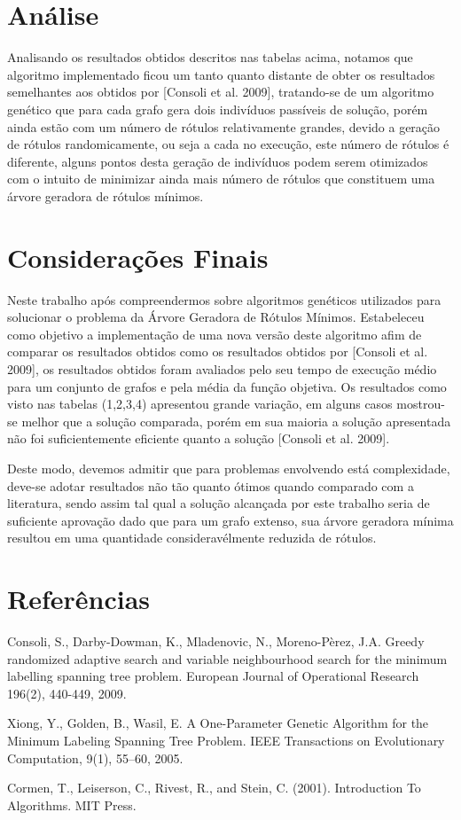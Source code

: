 \documentclass[12pt]{article}
\begin{document}
	\section{Análise}\label{sec:conclusao}

	Analisando os resultados obtidos descritos nas tabelas acima, notamos que algoritmo implementado ficou um tanto quanto distante de obter os resultados semelhantes aos obtidos por [Consoli et al. 2009], tratando-se de um algoritmo genético que para cada grafo gera dois indivíduos passíveis de solução, porém ainda estão com um número de rótulos relativamente grandes, devido a geração de rótulos randomicamente, ou seja a cada no execução, este número de rótulos é diferente, alguns pontos desta geração de indivíduos podem serem otimizados com o intuito de minimizar ainda mais número de rótulos que constituem uma árvore geradora de rótulos mínimos.

				
	\section{Considerações Finais}\label{sec:conclusao}

		Neste trabalho após compreendermos sobre algoritmos genéticos utilizados para solucionar o problema da Árvore Geradora de Rótulos Mínimos. Estabeleceu como objetivo a implementação de uma nova versão deste algoritmo afim de comparar os resultados obtidos como os resultados obtidos por [Consoli et al. 2009], os resultados obtidos foram avaliados pelo seu tempo de execução médio para um conjunto de grafos e pela média da função objetiva. Os resultados como visto nas tabelas (1,2,3,4) apresentou grande variação, em alguns casos mostrou-se melhor que a solução comparada, porém em sua maioria a solução apresentada não foi suficientemente eficiente quanto a solução [Consoli et al. 2009]. 

		Deste modo, devemos admitir que para problemas envolvendo está complexidade, deve-se adotar resultados não tão quanto ótimos quando comparado com a literatura, sendo assim tal qual a solução alcançada por este trabalho seria de suficiente aprovação dado que para um grafo extenso, sua árvore geradora mínima resultou em uma quantidade consideravélmente reduzida de rótulos.

	\section{Referências}\label{sec:referencias}

		\noindent Consoli, S., Darby-Dowman, K., Mladenovic, N., Moreno-Pèrez, J.A. Greedy randomized adaptive search and variable neighbourhood search for the minimum labelling spanning tree problem. European Journal of Operational
		Research 196(2), 440-449, 2009.
		
		\noindent Xiong, Y., Golden, B., Wasil, E. A One-Parameter Genetic Algorithm for the Minimum Labeling Spanning Tree Problem. IEEE Transactions on Evolutionary Computation, 9(1), 55–60, 2005.

		\noindent Cormen, T., Leiserson, C., Rivest, R., and Stein, C. (2001). Introduction To Algorithms. MIT Press.
\end{document}
